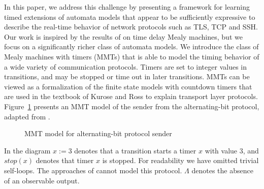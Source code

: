 In this paper, we address this challenge by presenting a framework for learning
timed extensions of automata models that appear to
be sufficiently expressive to describe the real-time behavior of network protocols such as TLS, TCP and SSH.
%
Our work is inspired by the results of \cite{CCF16} on time delay Mealy machines,
but we focus on a significantly richer class of automata models.
We introduce the class of Mealy machines with timers (MMTs) that is able to
model the timing behavior of a wide variety of communication protocols.
Timers are set to integer values in transitions, and may be stopped or
time out in later transitions.
MMTs can be viewed as a formalization of the finite state models with countdown timers that are used in the textbook of
Kurose and Ross \cite{KR13} to explain transport layer protocols.
Figure~\ref{fig:abp} presents an MMT model of the sender from 
the alternating-bit protocol, adapted from \cite[Figure 3.15]{KR13}.
\begin{figure}[h]
\centering
{}
\caption{MMT model for alternating-bit protocol sender}
\label{fig:abp}
\end{figure}
In the diagram $x :=3$ denotes that a transition starts a timer $x$ with value $3$,
and $\mathit{stop}(x)$ denotes that timer $x$ is stopped.
For readability we have omitted trivial self-loops.
The approaches of \cite{VWW:rti,CCF16} cannot model this protocol.
\iflong
$\Lambda$ denotes the absence of an observable output. 

